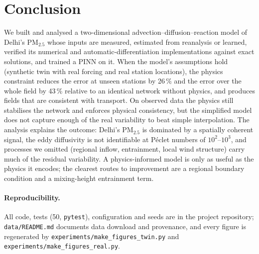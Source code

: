\documentclass[11pt,a4paper]{article}
\newcommand{\PMtwo}{PM$_{2.5}$}
\begin{document}
\section{Conclusion}
We built and analysed a two-dimensional advection--diffusion--reaction model of Delhi's \PMtwo{} whose inputs are
measured, estimated from reanalysis or learned, verified its numerical and automatic-differentiation implementations
against exact solutions, and trained a PINN on it. When the model's assumptions hold (synthetic twin with real
forcing and real station locations), the physics constraint reduces the error at unseen stations by 26\,\% and the
error over the whole field by 43\,\% relative to an identical network without physics, and produces fields that are
consistent with transport. On observed data the physics still stabilises the network and enforces physical
consistency, but the simplified model does not capture enough of the real variability to beat simple interpolation.
The analysis explains the outcome: Delhi's \PMtwo{} is dominated by a spatially coherent signal, the eddy diffusivity is
not identifiable at P\'eclet numbers of $10^2$--$10^3$, and processes we omitted (regional inflow, entrainment, local wind
structure) carry much of the residual variability. A physics-informed model is only as useful as the physics it encodes;
the clearest routes to improvement are a regional boundary condition and a mixing-height entrainment term.

\paragraph{Reproducibility.} All code, tests (50, \texttt{pytest}), configuration and seeds are in the project
repository; \texttt{data/README.md} documents data download and provenance, and every figure is regenerated by
\texttt{experiments/make\_figures\_twin.py} and \texttt{experiments/make\_figures\_real.py}.

\FloatBarrier


\end{document}
